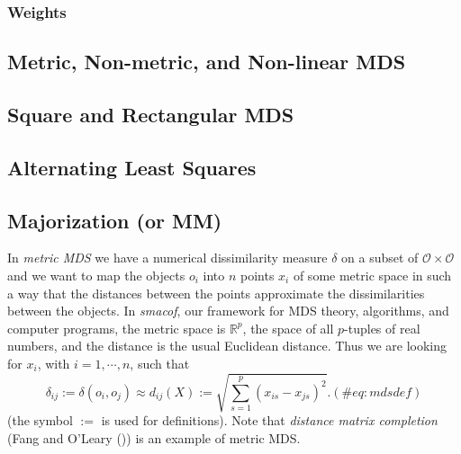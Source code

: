 \documentclass[
  12pt,
  letterpaper,
  DIV=11,
  numbers=noendperiod]{scrartcl}
\begin{document}
\subsubsection{Weights}\label{weights}

\subsection{Metric, Non-metric, and Non-linear
MDS}\label{metric-non-metric-and-non-linear-mds}

\subsection{Square and Rectangular
MDS}\label{square-and-rectangular-mds}

\subsection{Alternating Least Squares}\label{alternating-least-squares}

\subsection{Majorization (or MM)}\label{majorization-or-mm}

In \emph{metric MDS} we have a numerical dissimilarity measure
\(\delta\) on a subset of \(\mathcal{O}\times\mathcal{O}\) and we want
to map the objects \(o_i\) into \(n\) points \(x_i\) of some metric
space in such a way that the distances between the points approximate
the dissimilarities between the objects. In \emph{smacof}, our framework
for MDS theory, algorithms, and computer programs, the metric space is
\(\mathbb{R}^p\), the space of all \(p\)-tuples of real numbers, and the
distance is the usual Euclidean distance. Thus we are looking for
\(x_i\), with \(i=1,\cdots,n\), such that \begin{equation}
\delta_{ij}:=\delta(o_i,o_j)\approx d_{ij}(X):=\sqrt{\sum_{s=1}^p(x_{is}-x_{js})^2}.
(\#eq:mdsdef)
\end{equation} (the symbol \(:=\) is used for definitions). Note that
\emph{distance matrix completion} (Fang and O'Leary
()) is an example of metric MDS.
\end{document}
